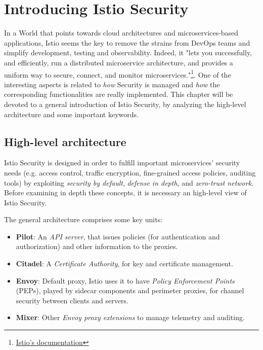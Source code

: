 \chapter{Introducing Istio Security}
In a World that points towards cloud architectures and microservices-based applications, Istio seems the key to remove the strains from DevOps teams and simplify development, testing and observability. Indeed, it "lets you successfully, and efficiently, run a distributed microservice architecture, and provides a uniform way to secure, connect, and monitor microservices."\footnote{\href{https://istio.io/docs/concepts/what-is-istio/}{Istio's documentation}}.
One of the interesting aspects is related to \textit{how} Security is managed and \textit{how} the corresponding functionalities are really implemented. This chapter will be devoted to a general introduction of Istio Security, by analyzing the high-level architecture and some important keywords.

\minitoc

\vspace{0.5cm}
\section{High-level architecture}
Istio Security is designed in order to fulfill important microservices' security needs (e.g. access control, traffic encryption, fine-grained access policies, auditing tools) by exploiting \textit{security by default}, \textit{defense in depth}, and \textit{zero-trust network}.
Before examining in depth these concepts, it is necessary an high-level view of  Istio Security.

The general architecture comprises some key units:

\begin{itemize}
    \item \textbf{Pilot}: An \textit{API server}, that issues policies (for authentication and authorization) and other information to the proxies.
    \item \textbf{Citadel}: A \textit{Certificate Authority}, for key and certificate management.
    \item \textbf{Envoy}: Default proxy, Istio uses it to have \textit{Policy Enforcement Points} (PEPs), played by sidecar components and perimeter proxies, for channel security between clients and servers. 
    \item \textbf{Mixer}: Other \textit{Envoy proxy extensions} to manage telemetry and auditing.
\end{itemize}

